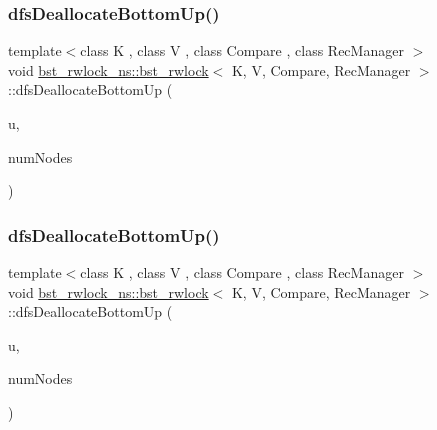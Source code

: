 \mbox{\label{classbst__rwlock__ns_1_1bst__rwlock_aa22ceca1ce1afc2b9b7a362fd779ff3a}} 
\subsubsection{\texorpdfstring{dfs\+Deallocate\+Bottom\+Up()}{dfsDeallocateBottomUp()}\hspace{0.1cm}{\footnotesize\ttfamily [1/2]}}
{\footnotesize\ttfamily template$<$class K , class V , class Compare , class Rec\+Manager $>$ \\
void \hyperlink{classbst__rwlock__ns_1_1bst__rwlock}{bst\+\_\+rwlock\+\_\+ns\+::bst\+\_\+rwlock}$<$ K, V, Compare, Rec\+Manager $>$\+::dfs\+Deallocate\+Bottom\+Up (\begin{DoxyParamCaption}\item[{\hyperlink{bst__rwlock__impl_8h_a04158d2a20768fe447133ff555823b05}{nodeptr} const}]{u,  }\item[{int $\ast$}]{num\+Nodes }\end{DoxyParamCaption})\hspace{0.3cm}{\ttfamily [inline]}}

\mbox{\label{classbst__rwlock__ns_1_1bst__rwlock_aa22ceca1ce1afc2b9b7a362fd779ff3a}} 
\subsubsection{\texorpdfstring{dfs\+Deallocate\+Bottom\+Up()}{dfsDeallocateBottomUp()}\hspace{0.1cm}{\footnotesize\ttfamily [2/2]}}
{\footnotesize\ttfamily template$<$class K , class V , class Compare , class Rec\+Manager $>$ \\
void \hyperlink{classbst__rwlock__ns_1_1bst__rwlock}{bst\+\_\+rwlock\+\_\+ns\+::bst\+\_\+rwlock}$<$ K, V, Compare, Rec\+Manager $>$\+::dfs\+Deallocate\+Bottom\+Up (\begin{DoxyParamCaption}\item[{\hyperlink{bst__rwlock__impl_8h_a04158d2a20768fe447133ff555823b05}{nodeptr} const}]{u,  }\item[{int $\ast$}]{num\+Nodes }\end{DoxyParamCaption})\hspace{0.3cm}{\ttfamily [inline]}}

